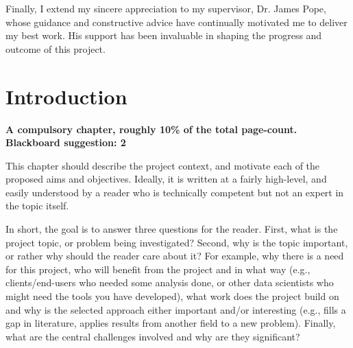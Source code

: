 \documentclass[ %
                    author={Revalda Putawara},
                supervisor={Dr. James Pope},
                    degree={MSc},
                     title={Robustness of Bayesian Neural Networks Design Choices Against Weight and Bias Perturbation Induced by Single Event Upsets (SEUs)},
                      type={},
                      year={2025}]{dissertation}
\begin{document}
Finally, I extend my sincere appreciation to my supervisor, Dr. James Pope, whose guidance and constructive advice have continually motivated me to deliver my best work. His support has been invaluable in shaping the progress and outcome of this project.




%

\mainmatter


\chapter{Introduction}
\label{chap:introduction}

\iffalse
{\bf A compulsory chapter, roughly 10\% of the total page-count. Blackboard suggestion: 2}
\vspace{1cm} 

\noindent
This chapter should describe the project context, and motivate each of
the proposed aims and objectives.  Ideally, it is written at a fairly 
high-level, and easily understood by a reader who is technically 
competent but not an expert in the topic itself.

In short, the goal is to answer three questions for the reader.  First, 
what is the project topic, or problem being investigated?  Second, why 
is the topic important, or rather why should the reader care about it?  
For example, why there is a need for this project, who will benefit from the 
project and in what way (e.g., clients/end-users who needed some analysis
done, or other data scientists who might need the tools you have developed), what 
work does the project build on and why is the selected approach either
important and/or interesting (e.g., fills a gap in literature, applies
results from another field to a new problem).  Finally, what are the 
central challenges involved and why are they significant? 
 
\end{document}
